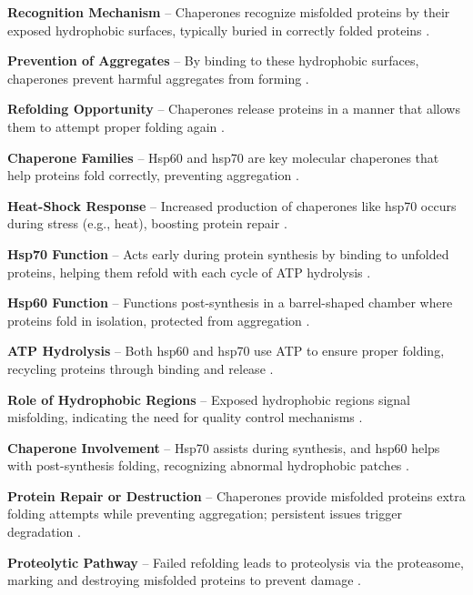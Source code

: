 \textbf{Recognition Mechanism} – Chaperones recognize misfolded proteins by their exposed hydrophobic surfaces, typically buried in correctly folded proteins \cite*{L1-Chapter6}.

\textbf{Prevention of Aggregates} – By binding to these hydrophobic surfaces, chaperones prevent harmful aggregates from forming \cite*{L1-Chapter6}.

\textbf{Refolding Opportunity} – Chaperones release proteins in a manner that allows them to attempt proper folding again \cite*{L1-Chapter6}.



\textbf{Chaperone Families} – Hsp60 and hsp70 are key molecular chaperones that help proteins fold correctly, preventing aggregation \cite*{L1-Chapter6}.

\textbf{Heat-Shock Response} – Increased production of chaperones like hsp70 occurs during stress (e.g., heat), boosting protein repair \cite*{L1-Chapter6}.

\textbf{Hsp70 Function} – Acts early during protein synthesis by binding to unfolded proteins, helping them refold with each cycle of ATP hydrolysis \cite*{L1-Chapter6}.

\textbf{Hsp60 Function} – Functions post-synthesis in a barrel-shaped chamber where proteins fold in isolation, protected from aggregation \cite*{L1-Chapter6}.

\textbf{ATP Hydrolysis} – Both hsp60 and hsp70 use ATP to ensure proper folding, recycling proteins through binding and release \cite*{L1-Chapter6}.



\textbf{Role of Hydrophobic Regions} – Exposed hydrophobic regions signal misfolding, indicating the need for quality control mechanisms \cite*{L1-Chapter6}.

\textbf{Chaperone Involvement} – Hsp70 assists during synthesis, and hsp60 helps with post-synthesis folding, recognizing abnormal hydrophobic patches \cite*{L1-Chapter6}.

\textbf{Protein Repair or Destruction} – Chaperones provide misfolded proteins extra folding attempts while preventing aggregation; persistent issues trigger degradation \cite*{L1-Chapter6}.

\textbf{Proteolytic Pathway} – Failed refolding leads to proteolysis via the proteasome, marking and destroying misfolded proteins to prevent damage \cite*{L1-Chapter6}.